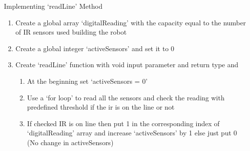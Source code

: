 \documentclass{beamer}
\begin{document}
	\begin{frame}{Implementing `readLine' Method}
	
	\begin{enumerate}
		
		\item{Create a global array `digitalReading' with the capacity equal to the number of IR sensors used building the robot}
		
		\item{Create a global integer `activeSensors' and set it to 0}
		
		\item{Create `readLine' function with void input parameter and return type and 
		
				\begin{enumerate}
				
					\item{At the beginning set `activeSensors = 0'}				
					\item{Use a `for loop' to read all the sensors and check the reading with predefined threshold if the ir is on the line or not}
					
					\item{If checked IR is on line then put 1 in the corresponding index of `digitalReading' array and increase `activeSensors' by 1 else just put 0 (No change in activeSensors)}
					
				
				\end{enumerate}
				
			}
			
		
		
		
	\end{enumerate}
		
	
	\end{frame}
	
\end{document}
